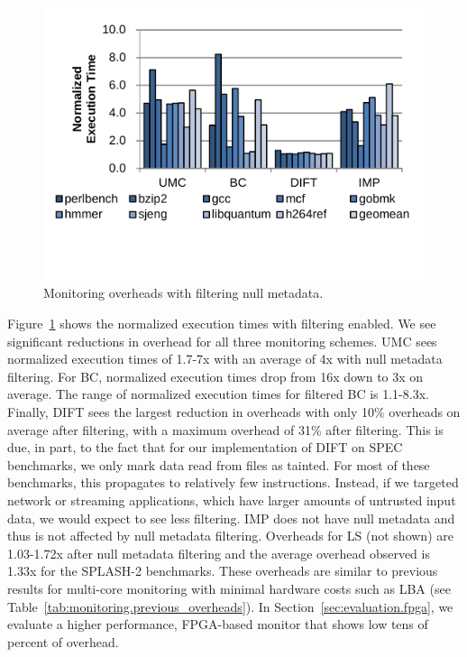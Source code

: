 \begin{figure}
  \begin{center}
    \includegraphics[width=\columnwidth, clip=true, trim=0 0.5in 0 0]{figs/data_filtering.pdf}
    \vspace{-0.2in}
    \caption{Monitoring overheads with filtering null metadata.}
    \label{fig:evaluation.filtering}
    \vspace{-0.1in}
  \end{center}
\end{figure}

Figure~\ref{fig:evaluation.filtering} shows the
normalized execution times with filtering enabled. We see significant
reductions in overhead for all three monitoring schemes. UMC sees normalized
execution times of 1.7-7x with an average of 4x with null metadata filtering.
For BC, normalized execution
times drop from 16x down to 3x on average. The range of normalized execution
times for filtered BC is 1.1-8.3x. 
Finally, DIFT sees the largest reduction in overheads with only 10\% overheads
on average after filtering, with a
maximum overhead of 31\% after filtering. This is due, in part, to the fact
that for our implementation of DIFT on SPEC
benchmarks, we only mark data read from files as tainted. For most of these
benchmarks, this propagates to relatively few instructions. Instead, if we
targeted network or streaming applications, which have larger amounts of
untrusted input data, we would expect to see less filtering. IMP does not have
null metadata and thus is not affected by null metadata filtering.
Overheads for LS (not shown) are 1.03-1.72x after null metadata filtering and the average
overhead observed is 1.33x for the SPLASH-2 benchmarks.
These overheads are similar to previous results for multi-core monitoring with
minimal hardware costs such as LBA \cite{lba-asid06} (see
Table~\ref{tab:monitoring.previous_overheads}). In
Section~\ref{sec:evaluation.fpga}, we evaluate a higher performance, FPGA-based
monitor that shows low tens of percent of overhead. 

